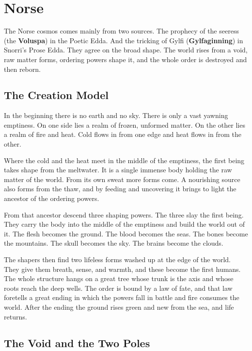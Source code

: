 \section{Norse}

The Norse cosmos comes mainly from two sources. The prophecy of the seeress (the \textbf{Voluspa}) in the Poetic Edda. And the tricking of Gylfi (\textbf{Gylfaginning}) in Snorri's Prose Edda. They agree on the broad shape. The world rises from a void, raw matter forms, ordering powers shape it, and the whole order is destroyed and then reborn.

\subsection{The Creation Model}

In the beginning there is no earth and no sky. There is only a vast yawning emptiness. On one side lies a realm of frozen, unformed matter. On the other lies a realm of fire and heat. Cold flows in from one edge and heat flows in from the other.

Where the cold and the heat meet in the middle of the emptiness, the first being takes shape from the meltwater. It is a single immense body holding the raw matter of the world. From its own sweat more forms come. A nourishing source also forms from the thaw, and by feeding and uncovering it brings to light the ancestor of the ordering powers.

From that ancestor descend three shaping powers. The three slay the first being. They carry the body into the middle of the emptiness and build the world out of it. The flesh becomes the ground. The blood becomes the seas. The bones become the mountains. The skull becomes the sky. The brains become the clouds.

The shapers then find two lifeless forms washed up at the edge of the world. They give them breath, sense, and warmth, and these become the first humans. The whole structure hangs on a great tree whose trunk is the axis and whose roots reach the deep wells. The order is bound by a law of fate, and that law foretells a great ending in which the powers fall in battle and fire consumes the world. After the ending the ground rises green and new from the sea, and life returns.

\subsection{The Void and the Two Poles}

